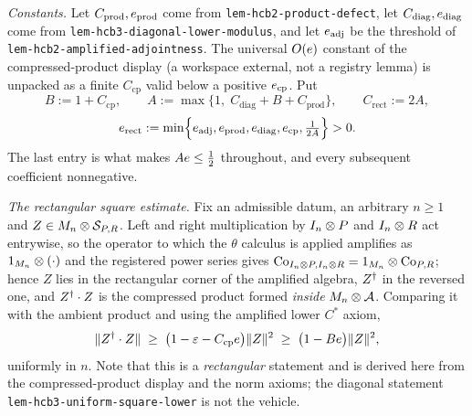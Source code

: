 \emph{Constants.} Let $C_{\mathrm{prod}},e_{\mathrm{prod}}$ come from
\texttt{lem-hcb2-product-defect}, let $C_{\mathrm{diag}},e_{\mathrm{diag}}$ come from
\texttt{lem-hcb3-diagonal-lower-modulus}, and let $e_{\mathrm{adj}}$ be the threshold
of \texttt{lem-hcb2-amplified-adjointness}. The universal $O(e)$ constant of the
compressed-product display (a workspace external, not a registry lemma) is unpacked as a
finite $C_{\mathrm{cp}}$ valid below a positive $e_{\mathrm{cp}}$. Put
\[
  B:=1+C_{\mathrm{cp}},\qquad
  A:=\max\{1,\;C_{\mathrm{diag}}+B+C_{\mathrm{prod}}\},\qquad
  C_{\mathrm{rect}}:=2A,
\]
\[
  e_{\mathrm{rect}}:=\min\Bigl\{e_{\mathrm{adj}},e_{\mathrm{prod}},
  e_{\mathrm{diag}},e_{\mathrm{cp}},\tfrac1{2A}\Bigr\}>0 .
\]
The last entry is what makes $Ae\le\tfrac12$ throughout, and every subsequent
coefficient nonnegative.

\emph{The rectangular square estimate.} Fix an admissible datum, an arbitrary $n\ge1$ and
$Z\in M_{n}\otimes \mathcal S_{P,R}$. Left and right multiplication by $I_{n}\otimes P$ and
$I_{n}\otimes R$ act entrywise, so the operator to which the $\theta$ calculus is applied
amplifies as $1_{M_{n}}\otimes(\cdot)$ and the registered power series gives
$\mathrm{Co}_{I_{n}\otimes P,I_{n}\otimes R}=1_{M_{n}}\otimes\mathrm{Co}_{P,R}$; hence $Z$ lies in the rectangular
corner of the amplified algebra, $Z^{\dagger}$ in the reversed one, and $Z^{\dagger}\mathbin{\cdot} Z$ is the
compressed product formed \emph{inside} $M_{n}\otimes \mathcal A$. Comparing it with the
ambient product and using the amplified lower $C^*$ axiom,
\begin{equation}\label{eq:odi-square}
  \lVert Z^{\dagger}\mathbin{\cdot} Z\rVert\;\ge\;\bigl(1-\varepsilon-C_{\mathrm{cp}}e\bigr)\lVert Z\rVert^{2}
  \;\ge\;\bigl(1-Be\bigr)\lVert Z\rVert^{2},
\end{equation}
uniformly in $n$. Note that this is a \emph{rectangular} statement and is derived here
from the compressed-product display and the norm axioms; the diagonal statement
\texttt{lem-hcb3-uniform-square-lower} is not the vehicle.

